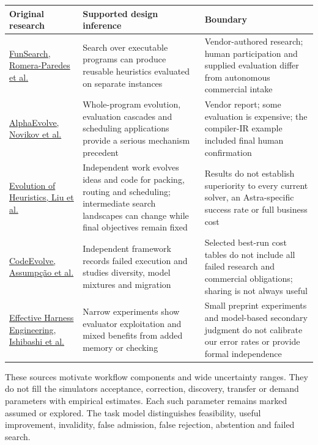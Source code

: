 \documentclass[
  10pt,
]{article}
\begin{document}
\begin{longtable}[]{@{}>{\raggedright\arraybackslash}p{.22\linewidth}>{\raggedright\arraybackslash}p{.37\linewidth}>{\raggedright\arraybackslash}p{.35\linewidth}@{}}
\toprule\noalign{}
Original research & Supported design inference & Boundary \\
\midrule\noalign{}
\endhead
\bottomrule\noalign{}
\endlastfoot
\href{https://www.nature.com/articles/s41586-023-06924-6}{FunSearch,
Romera-Paredes et al.} & Search over executable programs can produce
reusable heuristics evaluated on separate instances & Vendor-authored
research; human participation and supplied evaluation differ from
autonomous commercial intake \\
\href{https://arxiv.org/html/2506.13131v1}{AlphaEvolve, Novikov et al.}
& Whole-program evolution, evaluation cascades and scheduling
applications provide a serious mechanism precedent & Vendor report; some
evaluation is expensive; the compiler-IR example included final human
confirmation \\
\href{https://arxiv.org/html/2401.02051v3}{Evolution of Heuristics, Liu
et al.} & Independent work evolves ideas and code for packing, routing
and scheduling; intermediate search landscapes can change while final
objectives remain fixed & Results do not establish superiority to every
current solver, an Astra-specific success rate or full business cost \\
\href{https://arxiv.org/html/2510.14150v3}{CodeEvolve, Assumpção et al.}
& Independent framework records failed execution and studies diversity,
model mixtures and migration & Selected best-run cost tables do not
include all failed research and commercial obligations; sharing is not
always useful \\
\href{https://arxiv.org/html/2605.15221v1}{Effective Harness
Engineering, Ishibashi et al.} & Narrow experiments show evaluator
exploitation and mixed benefits from added memory or checking & Small
preprint experiments and model-based secondary judgment do not calibrate
our error rates or provide formal independence \\
\end{longtable}

These sources motivate workflow components and wide uncertainty ranges.
They do not fill the simulator\textquotesingle s acceptance, correction,
discovery, transfer or demand parameters with empirical estimates. Each
such parameter remains marked assumed or explored. The task model
distinguishes feasibility, useful improvement, invalidity, false
admission, false rejection, abstention and failed search.
\end{document}
